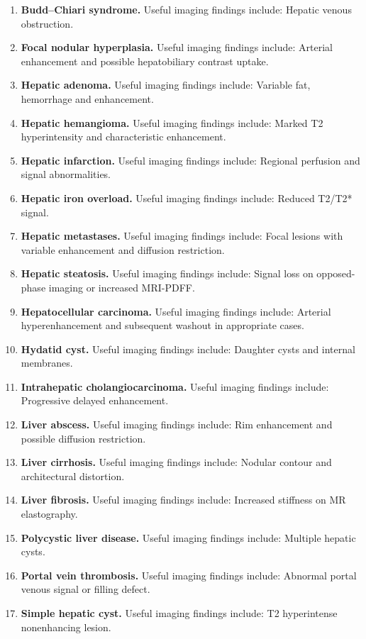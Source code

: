 \begin{enumerate}[leftmargin=*,itemsep=0.45em,topsep=0.4em]
\item \textbf{Budd--Chiari syndrome.} Useful imaging findings include: Hepatic venous obstruction.
\item \textbf{Focal nodular hyperplasia.} Useful imaging findings include: Arterial enhancement and possible hepatobiliary contrast uptake.
\item \textbf{Hepatic adenoma.} Useful imaging findings include: Variable fat, hemorrhage and enhancement.
\item \textbf{Hepatic hemangioma.} Useful imaging findings include: Marked T2 hyperintensity and characteristic enhancement.
\item \textbf{Hepatic infarction.} Useful imaging findings include: Regional perfusion and signal abnormalities.
\item \textbf{Hepatic iron overload.} Useful imaging findings include: Reduced T2/T2* signal.
\item \textbf{Hepatic metastases.} Useful imaging findings include: Focal lesions with variable enhancement and diffusion restriction.
\item \textbf{Hepatic steatosis.} Useful imaging findings include: Signal loss on opposed-phase imaging or increased MRI-PDFF.
\item \textbf{Hepatocellular carcinoma.} Useful imaging findings include: Arterial hyperenhancement and subsequent washout in appropriate cases.
\item \textbf{Hydatid cyst.} Useful imaging findings include: Daughter cysts and internal membranes.
\item \textbf{Intrahepatic cholangiocarcinoma.} Useful imaging findings include: Progressive delayed enhancement.
\item \textbf{Liver abscess.} Useful imaging findings include: Rim enhancement and possible diffusion restriction.
\item \textbf{Liver cirrhosis.} Useful imaging findings include: Nodular contour and architectural distortion.
\item \textbf{Liver fibrosis.} Useful imaging findings include: Increased stiffness on MR elastography.
\item \textbf{Polycystic liver disease.} Useful imaging findings include: Multiple hepatic cysts.
\item \textbf{Portal vein thrombosis.} Useful imaging findings include: Abnormal portal venous signal or filling defect.
\item \textbf{Simple hepatic cyst.} Useful imaging findings include: T2 hyperintense nonenhancing lesion.
\end{enumerate}

